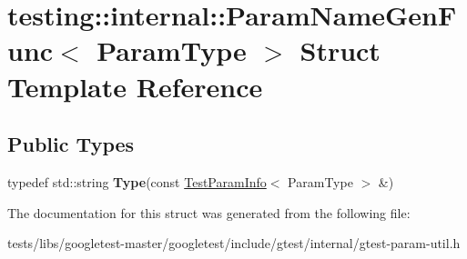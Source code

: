 \hypertarget{structtesting_1_1internal_1_1ParamNameGenFunc}{}\section{testing\+:\+:internal\+:\+:Param\+Name\+Gen\+Func$<$ Param\+Type $>$ Struct Template Reference}
\label{structtesting_1_1internal_1_1ParamNameGenFunc}
\subsection*{Public Types}
\begin{DoxyCompactItemize}
\item 
\mbox{\label{structtesting_1_1internal_1_1ParamNameGenFunc_adf1ce5df22a930ae715082862d72590f}} 
typedef std\+::string {\bfseries Type}(const \hyperlink{structtesting_1_1TestParamInfo}{Test\+Param\+Info}$<$ Param\+Type $>$ \&)
\end{DoxyCompactItemize}


The documentation for this struct was generated from the following file\+:\begin{DoxyCompactItemize}
\item 
tests/libs/googletest-\/master/googletest/include/gtest/internal/gtest-\/param-\/util.\+h\end{DoxyCompactItemize}
